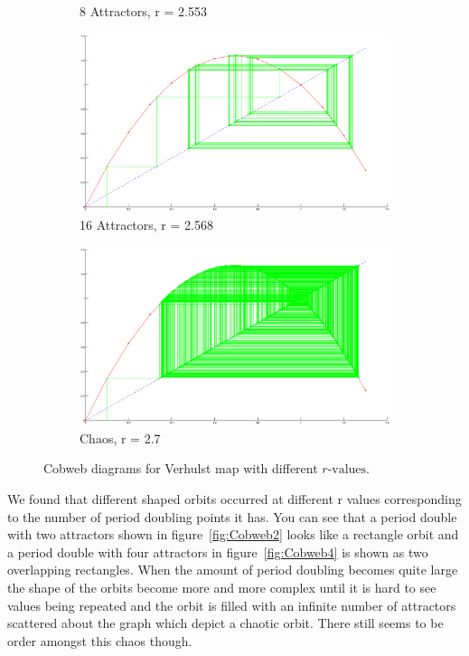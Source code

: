 \documentclass[a4wide, 10pt]{article}
\begin{document}
\begin{figure}[H]
\begin{subfigure}[b]{0.19\textwidth}
                \caption{8 Attractors, \newline r = 2.553}
                \label{fig:Cobweb8}
        \end{subfigure}
        \begin{subfigure}[b]{0.19\textwidth}
                \includegraphics[width=\textwidth]{EPSFiles/CobwebPD_16_VMap}
                \caption{16 Attractors, \newline r = 2.568}
                \label{fig:Cobweb16}
        \end{subfigure}
        \begin{subfigure}[b]{0.19\textwidth}
                \includegraphics[width=\textwidth]{EPSFiles/CobwebPD_Random_VMap}
                \caption{Chaos, \newline r = 2.7}
                \label{fig:CobwebChaos}
        \end{subfigure}  
        \caption{Cobweb diagrams for Verhulst map with different $r \textrm{-values}$.}
\end{figure}

We found that different shaped orbits occurred at different r values corresponding to the number of
 period doubling points it has. You can see that a period double with two attractors shown in figure~\ref{fig:Cobweb2}
  looks like a rectangle orbit and a period double with four attractors in figure~\ref{fig:Cobweb4} is
   shown as two overlapping rectangles. When the amount of period doubling becomes quite large the shape of the
    orbits become more and more complex until it is hard to see  
     values being repeated and the orbit is filled with an infinite number of attractors scattered
      about the graph which depict a chaotic orbit. There still seems to be order amongst this chaos
       though.
 
\end{document}
